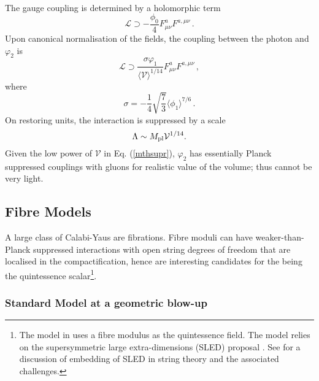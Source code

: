 \documentclass[11pt,a4paper]{article}
\newcommand{\be}{\begin{equation}}
\newcommand{\ee}{\end{equation}}
\newcommand{\V}{\mathcal{V}}
\def\pref#1{(\ref{#1})}
\begin{document}
\\
The gauge coupling is determined by a holomorphic term
%
\begin{equation}
\label{gc}
\mathcal{L} \supset - \frac{\phi_0}{4} F^a_{\mu \nu} F^{a, \mu \nu} \,.
\end{equation}
%
Upon canonical normalisation of the fields, the coupling between the photon and $\varphi_2$ is 
%
\begin{equation}
\label{eq:MTheoryGaugeCoupling}
\mathcal{L} \supset \frac{\sigma \varphi_1}{\langle\V\rangle^{1/14} } F^a_{\mu \nu} F^{a, \mu \nu} \,,
\end{equation}
%
where
%
\begin{equation}
\label{eq:Sigma}
\sigma = - \frac{1}{4} \sqrt{\frac{7}{3}} \langle \phi_1 \rangle^{7/6}  \,.
\end{equation}
%
On restoring units, the interaction is suppressed by a scale 
%
\be
\label{mthsupr}
  \Lambda \sim M_{\rm pl} \V^{1/14}.
\ee
%
Given the low power of $\V$ in Eq. \pref{mthsupr}, $\varphi_2$ has essentially Planck suppressed couplings with gluons for realistic value of the volume; thus cannot be very light.



%

\subsection{Fibre Models}

A large class of Calabi-Yaus are fibrations. Fibre moduli can have weaker-than-Planck suppressed interactions with open string degrees of freedom that are localised in the compactification, hence are interesting candidates for the being the quintessence scalar\footnote{The model in \cite{Cicoli:2012tz} uses a fibre modulus as the quintessence field. The model relies on the supersymmetric large extra-dimensions (SLED) proposal \cite{Aghababaie:2003wz}. See  \cite{Cicoli:2011yy} for a discussion of embedding of SLED in string theory and the associated challenges.}. 
 
\subsubsection{Standard Model at a geometric blow-up}
 
\end{document}
